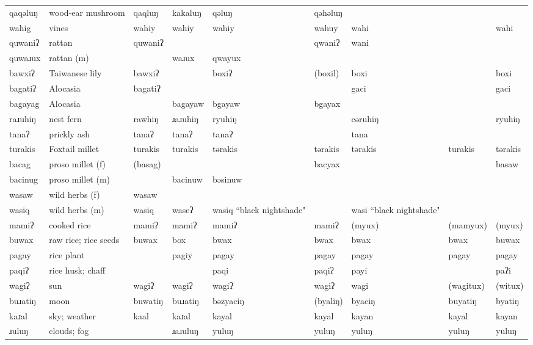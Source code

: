 \begin{landscape}
\begin{longtable}{*{9}{>{\raggedright\arraybackslash}p{}}}
\text{*}qaqəluŋ & wood-ear mushroom & qaqluŋ & kakaluŋ & qəluŋ & qəhəluŋ &  &  & \\
\text{*}wahig & vines & wahiy & wahiy & wahiy & wahuy & wahi &  & wahi\\
\text{*}quwaniʔ & rattan & quwaniʔ &  &  & qwaniʔ & wani &  & \\
\text{*}quwaɹux & rattan (m) &  & waɹux & qwayux &  &  &  & \\
\text{*}bawxiʔ & Taiwanese lily & bawxiʔ &  & boxiʔ & (boxil) & boxi &  & boxi\\
\text{*}bagatiʔ & Alocasia & bagatiʔ &  &  &  & gaci &  & gaci\\
\text{*}bagayag & Alocasia &  & bagayaw & bgayaw & bgayax &  &  & \\
\text{*}raɹuhiŋ & nest fern & rawhiŋ & ɹaɹuhiŋ & ryuhiŋ &  & cəruhiŋ &  & ryuhiŋ\\
\text{*}tanaʔ & prickly ash & tanaʔ & tanaʔ & tanaʔ &  & tana &  & \\
\text{*}turakis & Foxtail millet & turakis & turakis & tərakis & tərakis & tərakis & turakis & tərakis\\
\text{*}bacag & proso millet (f) & (basag) &  &  & bacyax &  &  & basaw\\
\text{*}bacinug & proso millet (m) &  & bacinuw & bəsinuw &  &  &  & \\
\text{*}wasaw & wild herbs (f) & wasaw &  &  &  &  &  & \\
\text{*}wasiq & wild herbs (m) & wasiq & waseʔ & wasiq ``black nightshade" &  & wasi ``black nightshade" &  & \\
\text{*}mamiʔ & cooked rice & mamiʔ & mamiʔ & mamiʔ & mamiʔ & (myux) & (mamyux) & (myux)\\
\text{*}buwax & raw rice; rice seeds & buwax & box & bwax & bwax & bwax & bwax & buwax\\
\text{*}pagay & rice plant &  & pagiy & pagay & pagay & pagay & pagay & pagay\\
\text{*}paqiʔ & rice husk; chaff &  &  & paqi & paqiʔ & payi &  & paʔi\\
\text{*}wagiʔ & sun & wagiʔ & wagiʔ & wagiʔ & wagiʔ & wagi & (wagitux) & (witux)\\
\text{*}buɹatiŋ & moon & buwatiŋ & buɹatiŋ & bəzyaciŋ & (byaliŋ) & byaciŋ & buyatiŋ & byatiŋ\\
\text{*}kaɹal & sky; weather & kaal & kaɹal & kayal & kayal & kayan & kayal & kayan\\
\text{*}ɹuluŋ & clouds; fog &  & ɹaɹuluŋ & yuluŋ & yuluŋ & yuluŋ & yuluŋ & yuluŋ\\

\end{longtable}
\end{landscape}

